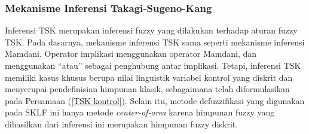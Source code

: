 \subsubsection{Mekanisme Inferensi Takagi-Sugeno-Kang}
\noindent Inferensi TSK merupakan inferensi fuzzy yang dilakukan terhadap aturan fuzzy TSK. Pada dasarnya, mekanisme inferensi TSK sama seperti mekanisme inferensi Mamdani. Operator implikasi menggunakan operator Mamdani, dan menggunakan ``atau'' sebagai penghubung antar implikasi. Tetapi, inferensi TSK memiliki kasus khusus berupa nilai linguistik variabel kontrol yang diskrit dan menyerupai pendefinisian himpunan klasik, sebagaimana telah diformulasikan pada Persamaan (\ref{TSK kontrol}). Selain itu, metode defuzzifikasi yang digunakan pada SKLF ini hanya metode \emph{center-of-area} karena himpunan fuzzy yang dihasilkan dari inferensi ini merupakan himpunan fuzzy diskrit.

